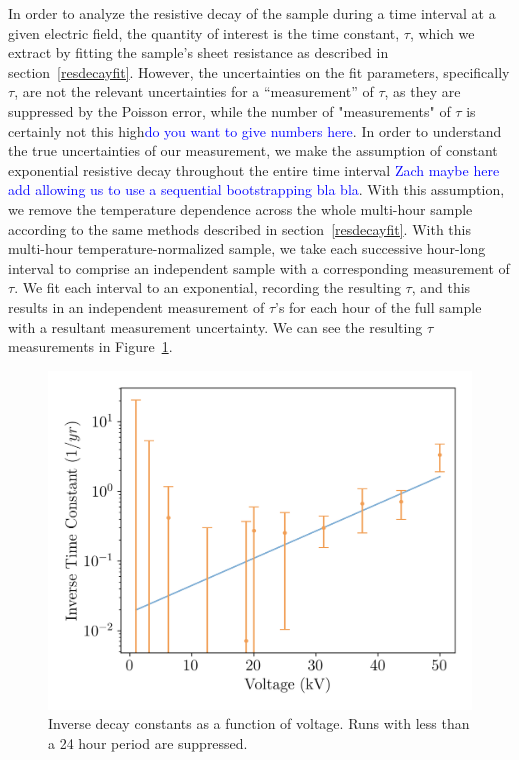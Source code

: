 \documentclass[a4paper,12pt]{article}
\newcommand{\RI}[1]{\textcolor{blue}{#1}}
\begin{document}
In order to analyze the resistive decay of the sample during a time interval at a given electric field, the quantity of interest is the time constant, $\tau$, which we extract by fitting the sample's sheet resistance as described in section~\ref{resdecayfit}. However, the uncertainties on the fit parameters, specifically $\tau$, are not the relevant uncertainties for a ``measurement'' of $\tau$, as they are suppressed by the Poisson error, while the number of "measurements" of $\tau$ is certainly not this high\RI{do you want to give numbers here}. In order to understand the true uncertainties of our measurement, we make the assumption of constant exponential resistive decay throughout the entire time interval \RI{Zach maybe here add allowing us to use a sequential bootstrapping bla bla}. With this assumption, we remove the temperature dependence across the whole multi-hour sample according to the same methods described in section~\ref{resdecayfit}. With this multi-hour temperature-normalized sample, we take each successive hour-long interval to comprise an independent sample with a corresponding measurement of $\tau$. We fit each interval to an exponential, recording the resulting $\tau$, and this results in an independent measurement of $\tau$'s for each hour of the full sample with a resultant measurement uncertainty. We can see the resulting $\tau$ measurements in Figure~\ref{fig:invtaulog}.

\begin{figure}
	\begin{center}
		
		\includegraphics[width=0.75\linewidth]{tau.png}
		\caption{Inverse decay constants as a function of voltage. Runs with less than a 24 hour period are suppressed.} 
		\label{fig:invtaulog}
	\end{center}
	
\end{figure}
\end{document}

